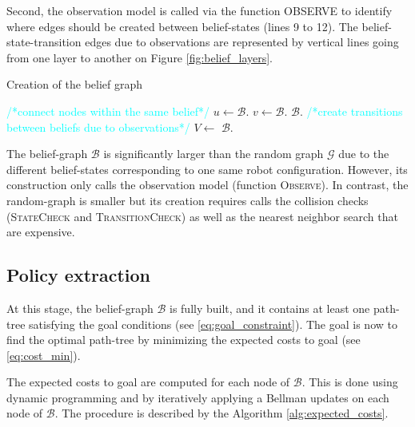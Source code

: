 \documentclass[letterpaper, 10 pt, conference]{ieeeconf}  %
\begin{document}
Second, the observation model is called via the function \textsc{OBSERVE} to identify where edges should be created between belief-states (lines 9 to 12). The belief-state-transition edges due to observations are represented by vertical lines going from one layer to another on Figure \ref{fig:belief_layers}.

\begin{algorithm}[H]
\caption{Creation of the belief graph}
\label{alg:belief}
\begin{algorithmic}[1]
	\State \textcolor{cyan}{\footnotesize/*connect nodes within the same belief*/}
			\State $u \gets \mathcal{B}$.
			\State $v \gets \mathcal{B}$.
			\State $\mathcal{B}$.
		\EndFor
	\EndFor
	\State \textcolor{cyan}{\footnotesize/*create transitions between beliefs due to observations*/}
	   	\State $V \gets$ 
			\State $\mathcal{B}$.
		\EndFor
	\EndFor
\EndFunction
\end{algorithmic}
\end{algorithm}

The belief-graph $\mathcal{B}$ is significantly larger than the random graph $\mathcal{G}$ due to the different belief-states corresponding to one same robot configuration. However, its construction only calls the observation model (function \textsc{Observe}). In contrast, the random-graph is smaller but its creation requires calls the collision checks (\textsc{StateCheck} and \textsc{TransitionCheck}) as well as the nearest neighbor search that are expensive.

\subsection{Policy extraction}

At this stage, the belief-graph $\mathcal{B}$ is fully built, and it contains at least one path-tree satisfying the goal conditions (see \ref{eq:goal_constraint}). The goal is now to find the optimal path-tree by minimizing the expected costs to goal (see \ref{eq:cost_min}).

The expected costs to goal are computed for each node of $\mathcal{B}$. This is done using dynamic programming and by iteratively applying a Bellman updates on each node of $\mathcal{B}$.
The procedure is described by the Algorithm \ref{alg:expected_costs}.
\end{document}
